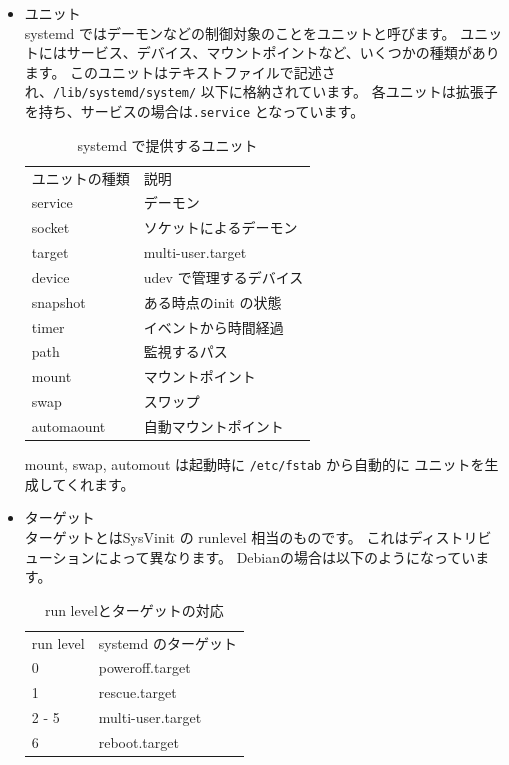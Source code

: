 \documentclass[mingoth,a4paper]{jsarticle}
\begin{document}
\begin{itemize}
\item ユニット\\
systemd ではデーモンなどの制御対象のことをユニットと呼びます。
ユニットにはサービス、デバイス、マウントポイントなど、いくつかの種類があります。
このユニットはテキストファイルで記述され、\texttt{/lib/systemd/system/} 以下に格納されています。
各ユニットは拡張子を持ち、サービスの場合は\texttt{.service}
となっています。


\begin{table}[htb]
\begin{center}
  \begin{tabular}{ll}
    ユニットの種類 & 説明 \\
    service & デーモン \\
    socket & ソケットによるデーモン \\
    target & multi-user.target \\
    device & udev で管理するデバイス \\
    snapshot & ある時点のinit の状態 \\
    timer & イベントから時間経過 \\
    path & 監視するパス \\
    mount & マウントポイント \\
    swap & スワップ \\
    automaount & 自動マウントポイント \\
  \end{tabular}
\caption{systemd で提供するユニット}
\label{tbl:unit}
\end{center}
\end{table}

mount, swap, automout は起動時に \texttt{/etc/fstab} から自動的に
ユニットを生成してくれます。

\item ターゲット\\
ターゲットとはSysVinit の runlevel 相当のものです。
これはディストリビューションによって異なります。
Debianの場合は以下のようになっています。

\begin{table}[htb]
\begin{center}
  \begin{tabular}{ll}
    run level & systemd のターゲット \\
    0 & poweroff.target \\
    1 & rescue.target \\
    2 - 5 & multi-user.target \\
    6 & reboot.target \\
  \end{tabular}
\caption{run levelとターゲットの対応}
\label{tbl:target}
\end{center}
\end{table}


\end{itemize}
\end{document}
